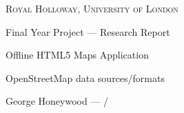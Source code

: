 


{
\centering
{\scshape\large Royal Holloway, University of London\par}
\vspace{0.5cm}
{\Huge Final Year Project --- Research Report\par}
\vspace{0.2cm}
{\Large Offline HTML5 Maps Application\par}
\vspace{0.2cm}
{\Huge OpenStreetMap data sources/formats\par}
\vspace{0.5cm}
{\large George Honeywood --- \the\month/\the\year\par}
\vspace{0.5cm}
}



\printbibliography{}

